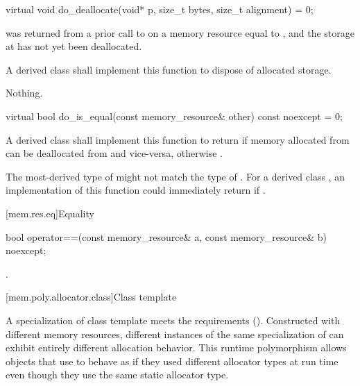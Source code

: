 %
\begin{itemdecl}
virtual void do_deallocate(void* p, size_t bytes, size_t alignment) = 0;
\end{itemdecl}

\begin{itemdescr}
\pnum
\expects
{} was returned from a prior call to 
on a memory resource equal to ,
and the storage at  has not yet been deallocated.

\pnum
\effects
A derived class shall implement this function to dispose of allocated storage.

\pnum
\throws
Nothing.
\end{itemdescr}

%
\begin{itemdecl}
virtual bool do_is_equal(const memory_resource& other) const noexcept = 0;
\end{itemdecl}

\begin{itemdescr}
\pnum
\returns
A derived class shall implement this function to return  if memory allocated from  can be deallocated from  and vice-versa,
otherwise .
\begin{note}
The most-derived type of  might not match the type of .
For a derived class , an implementation of this function
could immediately return 
if .
\end{note}
\end{itemdescr}

[mem.res.eq]{Equality}

%
\begin{itemdecl}
bool operator==(const memory_resource& a, const memory_resource& b) noexcept;
\end{itemdecl}

\begin{itemdescr}
\pnum
\returns
{}.
\end{itemdescr}

[mem.poly.allocator.class]{Class template }

\pnum
A specialization of class template 
meets the  requirements ().
Constructed with different memory resources,
different instances of the same specialization of 
can exhibit entirely different allocation behavior.
This runtime polymorphism allows objects that use 
to behave as if they used different allocator types at run time
even though they use the same static allocator type.

